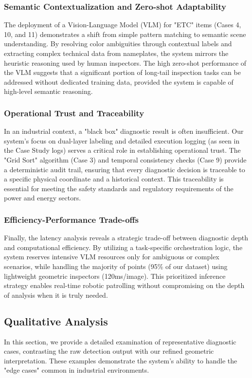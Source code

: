 \subsubsection{Semantic Contextualization and Zero-shot Adaptability}
The deployment of a Vision-Language Model (VLM) for "ETC" items (Cases 4, 10, and 11) demonstrates a shift from simple pattern matching to semantic scene understanding. By resolving color ambiguities through contextual labels and extracting complex technical data from nameplates, the system mirrors the heuristic reasoning used by human inspectors. The high zero-shot performance of the VLM suggests that a significant portion of long-tail inspection tasks can be addressed without dedicated training data, provided the system is capable of high-level semantic reasoning.

\subsubsection{Operational Trust and Traceability}
In an industrial context, a "black box" diagnostic result is often insufficient. Our system's focus on dual-layer labeling and detailed execution logging (as seen in the Case Study logs) serves a critical role in establishing operational trust. The "Grid Sort" algorithm (Case 3) and temporal consistency checks (Case 9) provide a deterministic audit trail, ensuring that every diagnostic decision is traceable to a specific physical coordinate and a historical context. This traceability is essential for meeting the safety standards and regulatory requirements of the power and energy sectors.

\subsubsection{Efficiency-Performance Trade-offs}
Finally, the latency analysis reveals a strategic trade-off between diagnostic depth and computational efficiency. By utilizing a task-specific orchestration logic, the system reserves intensive VLM resources only for ambiguous or complex scenarios, while handling the majority of points (95\% of our dataset) using lightweight geometric inspectors (120ms/image). This prioritized inference strategy enables real-time robotic patrolling without compromising on the depth of analysis when it is truly needed.

\subsection{Qualitative Analysis}
In this section, we provide a detailed examination of representative diagnostic cases, contrasting the raw detection output with our refined geometric interpretation. These examples demonstrate the system's ability to handle the "edge cases" common in industrial environments.

